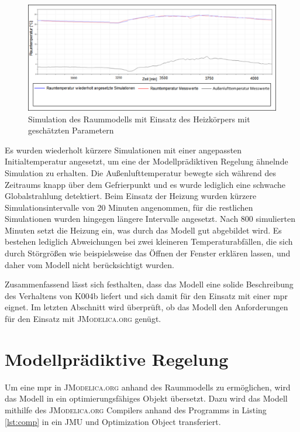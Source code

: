 \begin{figure}
\centering
\includegraphics[width=\textwidth]{abbildungen/20160330_benchmark}
\caption{Simulation des Raummodells mit Einsatz des Heizkörpers mit geschätzten Parametern}
\label{fig:bench}
\end{figure}

Es wurden wiederholt kürzere Simulationen mit einer angepassten Initialtemperatur angesetzt, um eine der Modellprädiktiven Regelung ähnelnde Simulation zu erhalten. Die Außenlufttemperatur bewegte sich während des Zeitraums knapp über dem Gefrierpunkt und es wurde lediglich eine schwache Globalstrahlung detektiert. Beim Einsatz der Heizung wurden kürzere Simulationsintervalle von 20 Minuten angenommen, für die restlichen Simulationen wurden hingegen längere Intervalle angesetzt.
Nach 800 simulierten Minuten setzt die Heizung ein, was durch das Modell gut abgebildet wird. Es bestehen lediglich Abweichungen bei zwei kleineren Temperaturabfällen, die sich durch Störgrößen wie beispielsweise das Öffnen der Fenster erklären lassen, und daher vom Modell nicht berücksichtigt wurden.

Zusammenfassend lässt sich festhalten, dass das Modell eine solide Beschreibung des Verhaltens von K004b liefert und sich damit für den Einsatz mit einer \acrlong{mpr} eignet. Im letzten Abschnitt wird überprüft, ob das Modell den Anforderungen für den Einsatz mit \textsc{JModelica.org} genügt.

\section{Modellprädiktive Regelung}

Um eine \acrlong{mpr} in \textsc{\textsc{JModelica.org}} anhand des Raummodells zu ermöglichen, wird das Modell in ein optimierungsfähiges Objekt übersetzt. Dazu wird das Modell mithilfe des \textsc{JModelica.org} Compilers anhand des Programms in Listing \ref{lst:comp} in ein JMU und Optimization Object transferiert.

